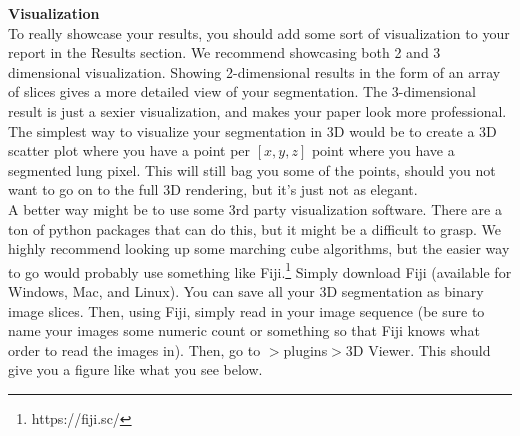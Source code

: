\documentclass[10pt]{article}
\begin{document}
\clearpage
\noindent \Large \textbf{Visualization} \normalsize \\
\noindent\makebox[\linewidth]{\rule{\textwidth}{0.4pt}}
\indent To really showcase your results, you should add some sort of visualization to your report in the Results section.  We recommend showcasing both 2 and 3 dimensional visualization.  Showing 2-dimensional results in the form of an array of slices gives a more detailed view of your segmentation.  The 3-dimensional result is just a sexier visualization, and makes your paper look more professional.\\
\indent The simplest way to visualize your segmentation in 3D would be to create a 3D scatter plot where you have a point per $[x,y,z]$ point where you have a segmented lung pixel.  This will still bag you some of the points, should you not want to go on to the full 3D rendering, but it's just not as elegant.\\
\indent A better way might be to use some 3rd party visualization software.  There are a ton of python packages that can do this, but it might be a difficult to grasp.  We highly recommend looking up some marching cube algorithms, but the easier way to go would probably use something like Fiji.\footnote{https://fiji.sc/}  Simply download Fiji (available for Windows, Mac, and Linux).  You can save all your 3D segmentation as binary image slices.  Then, using Fiji, simply read in your image sequence (be sure to name your images some numeric count or something so that Fiji knows what order to read the images in).  Then, go to $>$plugins$>$3D Viewer.  This should give you a figure like what you see below.
\end{document}
